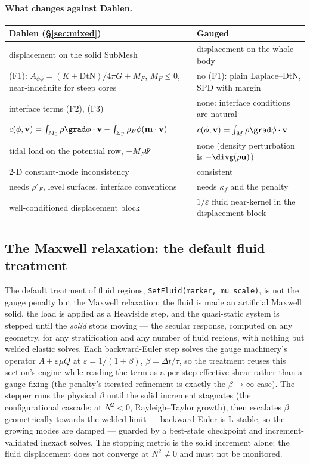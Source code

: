 \documentclass[11pt]{article}
\numberwithin{equation}{section}
\theoremstyle{remark}
\newcommand{\eps}{\varepsilon}
\newcommand{\DtN}{\mathrm{DtN}}
\newcommand{\vu}{\mathbf{u}}
\newcommand{\vv}{\mathbf{v}}
\newcommand{\vm}{\mathbf{m}}
\newcommand{\MS}{M_{\mathrm{S}}}
\newcommand{\SF}{\Sigma_{\mathrm{F}}}
\newcommand{\code}[1]{\texttt{#1}}
\begin{document}
\paragraph{What changes against Dahlen.}
\begin{center}
\small
\begin{tabular}{@{}P{7.0cm}P{7.0cm}@{}}
\toprule
Dahlen (\S\ref{sec:mixed}) & Gauged \\
\midrule
displacement on the solid SubMesh & displacement on the whole body \\
(F1): $A_{\phi\phi} = (K+\DtN)/4\pi G + M_F$, $M_F\le0$, near-indefinite for steep cores & no (F1): plain Laplace--DtN, SPD with margin \\
interface terms (F2), (F3) & none: interface conditions are natural \\
$c(\phi,\vv) = \int_{\MS}\rho\grad\phi\cdot\vv - \int_{\SF}\rho_F\phi(\vm\cdot\vv)$ &$c(\phi,\vv) = \int_M\rho\grad\phi\cdot\vv$ \\
tidal load on the potential row, $-M_F\Psi$ & none (density perturbation is $-\divg(\rho\vu)$) \\
2-D constant-mode inconsistency & consistent \\
needs $\rho'_F$, level surfaces, interface conventions & needs $\kappa_f$ and the penalty \\
well-conditioned displacement block & $1/\eps$ fluid near-kernel in the displacement block \\
\bottomrule
\end{tabular}
\end{center}

\subsection{The Maxwell relaxation: the default fluid treatment}
\label{sec:maxwell}

The default treatment of fluid regions,
\code{SetFluid(marker, mu\_scale)}, is not the gauge penalty but the
Maxwell relaxation: the fluid is made an artificial Maxwell solid, the
load is applied as a Heaviside step, and the quasi-static system is
stepped until the \emph{solid} stops moving --- the secular response,
computed on any geometry, for any stratification and any number of fluid
regions, with nothing but welded elastic solves. Each backward-Euler step
solves the gauge machinery's operator $A + \eps\mu Q$ at
$\eps = 1/(1+\beta)$, $\beta = \Delta t/\tau$, so the treatment reuses
this section's engine while reading the term as a per-step effective
shear rather than a gauge fixing (the penalty's iterated refinement is
exactly the $\beta\to\infty$ case). The stepper runs the physical $\beta$
until the solid increment stagnates (the configurational cascade; at
$N^2<0$, Rayleigh--Taylor growth), then escalates $\beta$ geometrically
towards the welded limit --- backward Euler is L-stable, so the growing
modes are damped --- guarded by a best-state checkpoint and
increment-validated inexact solves. The stopping metric is the solid
increment alone: the fluid displacement does not converge at
$N^2\neq0$ and must not be monitored.
\end{document}
